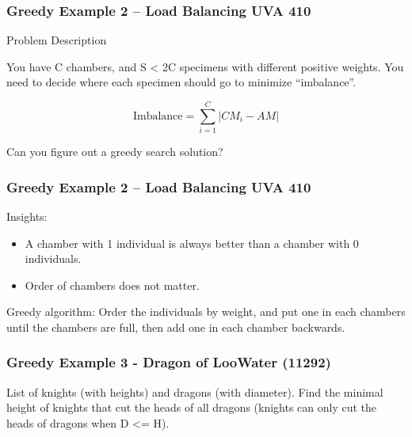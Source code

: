 \documentclass{beamer}
\begin{document}
\begin{frame}
  \frametitle{Greedy Example 2 -- Load Balancing UVA 410}

  \begin{block}{Problem Description}
    

  You have C chambers, and S < 2C specimens with different positive
  weights. You need to decide where each specimen should go to
  minimize ``imbalance''.
  \end{block}
  
  \begin{equation*}
    \text{Imbalance} = \sum_{i=1}^C |CM_i - AM|
  \end{equation*}

  Can you figure out a greedy search solution?
\end{frame}
\begin{frame}
  \frametitle{Greedy Example 2 -- Load Balancing UVA 410}
  Insights:

  \begin{itemize}
  \item A chamber with 1 individual is always better than a chamber
    with 0 individuals.

    \medskip

  \item Order of chambers does not matter.
  \end{itemize}

  \vfill

  Greedy algorithm: Order the individuals by weight, and 
  put one in each chambers until the chambers are full, then add one
  in each chamber backwards.
\end{frame}

\begin{frame}
  \frametitle{Greedy Example 3 - Dragon of LooWater (11292)}
  List of knights (with heights) and dragons (with diameter). Find the 
  minimal height of knights that cut the heads of all dragons 
  (knights can only cut the heads of dragons when D <= H).

\end{frame}

\end{document}
